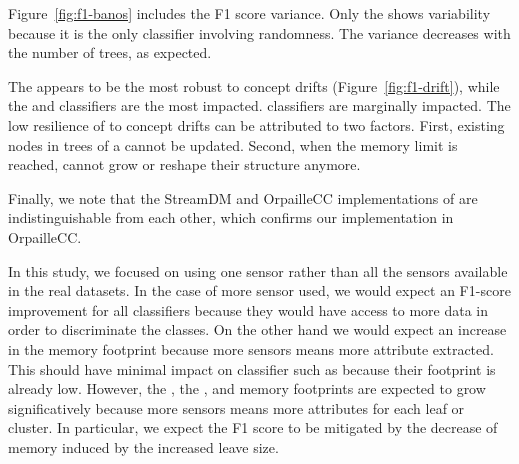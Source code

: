 Figure~\ref{fig:f1-banos} includes the F1 score variance. Only the
\mondrianforest shows variability because it is the only classifier involving
randomness. The variance decreases with the number of trees, as expected.

The \hoeffdingtree appears to be the most robust to concept drifts
(Figure~\ref{fig:f1-drift}), while the \mondrianforest and \naivebayes
classifiers are the most impacted. \mcnn classifiers are marginally impacted.
The low resilience of \mondrianforest to concept drifts can be attributed to
two factors. First, existing nodes in trees of a \mondrianforest cannot be updated.
Second, when the memory limit is reached, \mondrianforest cannot grow
or reshape their structure anymore.

Finally, we note that the StreamDM and OrpailleCC implementations of
\naivebayes are indistinguishable from each other, which confirms our
implementation in OrpailleCC.

In this study, we focused on using one sensor rather than all the sensors
available in the real datasets. In the case of more sensor used, we would expect
an F1-score improvement for all classifiers because they would have access to
more data in order to discriminate the classes. On the other hand we would
expect an increase in the memory footprint because more sensors means more
attribute extracted. This should have minimal impact on classifier such as
\naivebayes because their footprint is already low. However, the
\mondrianforest, the \hoeffdingtree, and \mcnn memory footprints are expected to
grow significatively because more sensors means more attributes for each leaf or
cluster. In particular, we expect the \mondrianforest F1 score to be mitigated
by the decrease of memory induced by the increased leave size.

